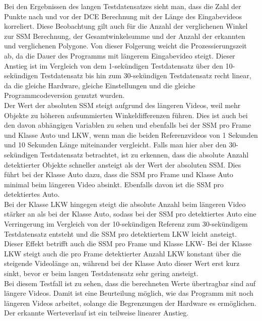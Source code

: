 {{		Bei den Ergebnissen des langen Testdatensatzes sieht man, dass die Zahl der Punkte nach und vor der DCE Berechnung mit der Länge des Eingabevideos korreliert. Diese Beobachtung gilt auch für die Anzahl der verglichenen Winkel zur SSM Berechnung, der Gesamtwinkelsumme und der Anzahl der erkannten und verglichenen Polygone. Von dieser Folgerung weicht die Prozessierungszeit ab, da die Dauer des Programms mit längerem Eingabevideo steigt. Dieser Anstieg ist im Vergleich von dem 1-sekündigen Testdatensatz über den 10-sekündigen Testdatensatz bis hin zum 30-sekündigen Testdatensatz recht linear, da die gleiche Hardware, gleiche Einstellungen und die gleiche Programmcodeversion genutzt wurden. \\
		Der Wert der absoluten SSM steigt aufgrund des längeren Videos, weil mehr Objekte zu höheren aufsummierten Winkeldifferenzen führen. Dies ist auch bei den davon abhängigen Variablen zu sehen und ebenfalls bei der SSM pro Frame und Klasse Auto und LKW, wenn man die beiden Referenzvideos von 1 Sekunden und 10 Sekunden Länge miteinander vergleicht. Falls man hier aber den 30-sekündigen Testdatensatz betrachtet, ist zu erkennen, dass die absolute Anzahl detektierter Objekte schneller ansteigt als der Wert der absoluten SSM. Dies führt bei der Klasse Auto dazu, dass die SSM pro Frame und Klasse Auto minimal beim längeren Video absinkt. Ebenfalls davon ist die SSM pro detektiertes Auto. \\
		Bei der Klasse LKW hingegen steigt die absolute Anzahl beim längeren Video stärker an als bei der Klasse Auto, sodass bei der SSM pro detektiertes Auto eine Verringerung im Vergleich von der 10-sekündigen Referenz zum 30-sekündigem Testdatensatz entsteht und die SSM pro detektiertem LKW leicht ansteigt. Dieser Effekt betrifft auch die SSM pro Frame und Klasse LKW- Bei der Klasse LKW steigt auch die pro Frame detektierter Anzahl LKW konstant über die steigende Videolänge an, während bei der Klasse Auto dieser Wert erst kurz sinkt, bevor er beim langen Testdatensatz sehr gering ansteigt. \\
		Bei diesem Testfall ist zu sehen, dass die berechneten Werte übertragbar sind auf längere Videos. Damit ist eine Beurteilung möglich, wie das Programm mit noch längeren Videos arbeitet, solange die Begrenzungen der Hardware es ermöglichen. Der erkannte Werteverlauf ist ein teilweise linearer Anstieg. \\






	}
}
